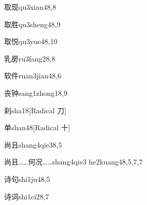 \begin{verbete}{取现}{qu3xian4}{8,8}
\end{verbete}

\begin{verbete}{取胜}{qu3sheng4}{8,9}
\end{verbete}

\begin{verbete}{取悦}{qu3yue4}{8,10}
\end{verbete}

\begin{verbete}{乳房}{ru3fang2}{8,8}
\end{verbete}

\begin{verbete}{软件}{ruan3jian4}{8,6}
\end{verbete}

\begin{verbete}{丧钟}{sang1zhong1}{8,9}
\end{verbete}

\begin{verbete}{刹}{sha1}{8}[Radical 刀]
\end{verbete}

\begin{verbete}{单}{shan4}{8}[Radical 十]
\end{verbete}

\begin{verbete}{尚且}{shang4qie3}{8,5}
\end{verbete}

\begin{verbete}{尚且……何况……}{shang4qie3 he2kuang4}{8,5,7,7}
\end{verbete}

\begin{verbete}{诗句}{shi1ju4}{8,5}
\end{verbete}

\begin{verbete}{诗词}{shi1ci2}{8,7}
\end{verbete}

